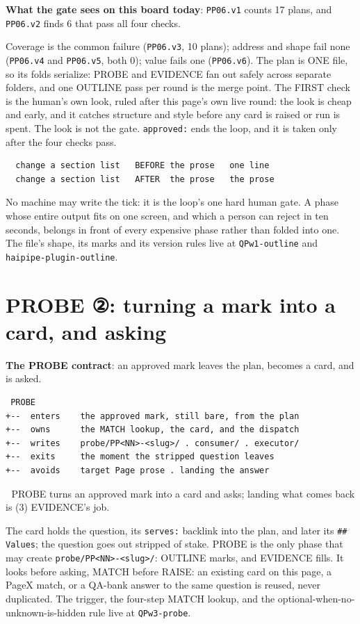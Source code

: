 \textbf{What the gate sees on this board today}: \texttt{PP06.v1} counts 17 plans, and \texttt{PP06.v2} finds 6 that pass all four checks.

Coverage is the common failure (\texttt{PP06.v3}, 10 plans); address and shape fail none (\texttt{PP06.v4} and \texttt{PP06.v5}, both 0); value fails one (\texttt{PP06.v6}). The plan is ONE file, so its folds serialize: PROBE and EVIDENCE fan out safely across separate folders, and one OUTLINE pass per round is the merge point. The FIRST check is the human's own look, ruled after this page's own live round: the look is cheap and early, and it catches structure and style before any card is raised or run is spent. The look is not the gate. \texttt{approved:} ends the loop, and it is taken only after the four checks pass.

\begin{verbatim}
  change a section list   BEFORE the prose   one line
  change a section list   AFTER  the prose   the prose
\end{verbatim}
No machine may write the tick: it is the loop's one hard human gate. A phase whose entire output fits on one screen, and which a person can reject in ten seconds, belongs in front of every expensive phase rather than folded into one. The file's shape, its marks and its version rules live at \texttt{QPw1-outline} and \texttt{haipipe-plugin-outline}.


\section{PROBE ②: turning a mark into a card, and asking}
\textbf{The PROBE contract}: an approved mark leaves the plan, becomes a card, and is asked.

\begin{verbatim}
 PROBE
+--  enters    the approved mark, still bare, from the plan
+--  owns      the MATCH lookup, the card, and the dispatch
+--  writes    probe/PP<NN>-<slug>/ . consumer/ . executor/
+--  exits     the moment the stripped question leaves
+--  avoids    target Page prose . landing the answer
\end{verbatim}
📌 PROBE turns an approved mark into a card and asks; landing what comes back is (3) EVIDENCE's job.

The card holds the question, its \texttt{serves:} backlink into the plan, and later its \texttt{\#\# Values}; the question goes out stripped of stake. PROBE is the only phase that may create \texttt{probe/PP<NN>-<slug>/}: OUTLINE marks, and EVIDENCE fills. It looks before asking, MATCH before RAISE: an existing card on this page, a PageX match, or a QA-bank answer to the same question is reused, never duplicated. The trigger, the four-step MATCH lookup, and the optional-when-no-unknown-is-hidden rule live at \texttt{QPw3-probe}.

